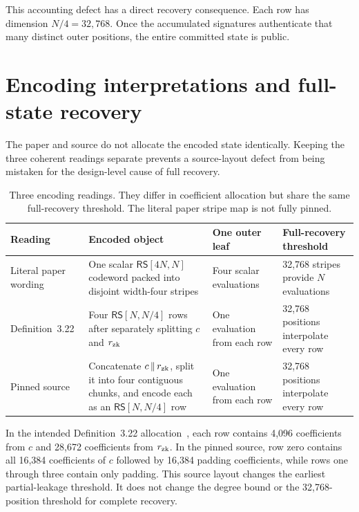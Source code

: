 \documentclass[10pt,a4paper]{article}
\newcommand{\RS}{\mathsf{RS}}
\begin{document}
This accounting defect has a direct recovery consequence. Each row has
dimension $N/4=32{,}768$. Once the accumulated signatures authenticate that
many distinct outer positions, the entire committed state is public.

\section{Encoding interpretations and full-state recovery}
\label{sec:encodings}

The paper and source do not allocate the encoded state identically. Keeping the
three coherent readings separate prevents a source-layout defect from being
mistaken for the design-level cause of full recovery.

\begin{table}[ht]
\centering
\scriptsize
\begin{tabularx}{\textwidth}{@{}p{}YYp{0.19\textwidth}@{}}
\toprule
Reading & Encoded object & One outer leaf & Full-recovery threshold \\
\midrule
Literal paper wording
& One scalar $\RS[4N,N]$ codeword packed into disjoint width-four stripes
& Four scalar evaluations
& 32,768 stripes provide $N$ evaluations \\
Definition~3.22
& Four $\RS[N,N/4]$ rows after separately splitting $c$ and $r_{\rm zk}$
& One evaluation from each row
& 32,768 positions interpolate every row \\
Pinned source
& Concatenate $c\,\|\,r_{\rm zk}$, split it into four contiguous chunks, and
  encode each as an $\RS[N,N/4]$ row
& One evaluation from each row
& 32,768 positions interpolate every row \\
\bottomrule
\end{tabularx}
\caption{Three encoding readings. They differ in coefficient allocation but
share the same full-recovery threshold. The literal paper stripe map is not
fully pinned.}
\label{tab:encodings}
\end{table}

In the intended Definition~3.22 allocation~\cite{zkwhir}, each row contains
4,096 coefficients from $c$ and 28,672 coefficients from $r_{\rm zk}$. In the
pinned source, row zero contains all 16,384 coefficients of $c$ followed by
16,384 padding coefficients, while rows one through three contain only
padding. This source layout changes the earliest partial-leakage threshold. It
does not change the degree bound or the 32,768-position threshold for complete
recovery.
\end{document}
